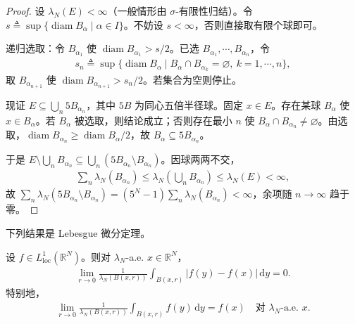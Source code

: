 \documentclass[../../main.tex]{subfiles}%
\begin{document}
\begin{proof}
设 $\lambda_N(E)<\infty$（一般情形由 $\sigma$-有限性归结）。令 $s\triangleq \sup\{\operatorname{diam}B_\alpha\mid\alpha\in I\}$。不妨设 $s<\infty$，否则直接取有限个球即可。

递归选取：令 $B_{\alpha_1}$ 使 $\operatorname{diam}B_{\alpha_1}>s/2$。已选 $B_{\alpha_1},\cdots ,B_{\alpha_n}$，令
\begin{align*}
s_n\triangleq \sup\{\operatorname{diam}B_\alpha\mid B_\alpha\cap B_{\alpha_k}=\varnothing ,\ k=1,\cdots ,n\},
\end{align*}
取 $B_{\alpha_{n+1}}$ 使 $\operatorname{diam}B_{\alpha_{n+1}}>s_n/2$。若集合为空则停止。

现证 $E\subseteq\bigcup_n 5B_{\alpha_n}$，其中 $5B$ 为同心五倍半径球。固定 $x\in E$。存在某球 $B_\alpha$ 使 $x\in B_\alpha$。若 $B_\alpha$ 被选取，则结论成立；否则存在最小 $n$ 使 $B_\alpha\cap B_{\alpha_n}\neq\varnothing $。由选取，$\operatorname{diam}B_{\alpha_n}\geqslant\operatorname{diam}B_\alpha/2$，故 $B_\alpha\subseteq 5B_{\alpha_n}$。

于是 $E\setminus\bigcup_n B_{\alpha_n}\subseteq\bigcup_n(5B_{\alpha_n}\setminus B_{\alpha_n})$。因球两两不交，
\begin{align*}
\sum_n\lambda_N(B_{\alpha_n})\leqslant\lambda_N\left(\bigcup_n B_{\alpha_n}\right)\leqslant\lambda_N(E)<\infty,
\end{align*}
故 $\sum_n\lambda_N(5B_{\alpha_n}\setminus B_{\alpha_n})=(5^N-1)\sum_n\lambda_N(B_{\alpha_n})<\infty$，余项随 $n\to\infty$ 趋于零。
\end{proof}

下列结果是 Lebesgue 微分定理。

\begin{theorem}[Lebesgue 微分]\label{theorem:ch02-Lebesgue微分}\label{corollary:ch02-Lebesgue点}\label{corollary:ch02-Lebesgue微分}
设 $f\in L^1_{\mathrm{loc}}(\mathbb R^N)$。则对 $\lambda_N$-a.e. $x\in\mathbb R^N$，
\begin{align}
\lim_{r\to0}\frac1{\lambda_N(B(x,r))}\int_{B(x,r)}|f(y)-f(x)|\,\mathrm{d}y=0. \label{align:ch02-2.77}
\end{align}
特别地，
\begin{align}
\lim_{r\to0}\frac1{\lambda_N(B(x,r))}\int_{B(x,r)}f(y)\,\mathrm{d}y=f(x)\quad\text{对 }\lambda_N\text{-a.e. }x. \label{align:ch02-2.78}
\end{align}
\end{theorem}
\end{document}

